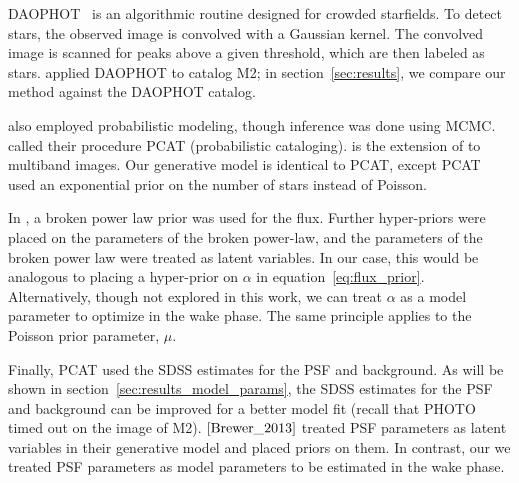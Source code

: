 DAOPHOT~\cite{stetson2987daophot} is an algorithmic routine designed for crowded starfields. To detect stars, the observed image is convolved with a Gaussian kernel. The convolved image is scanned for peaks above a given threshold, which are then labeled as stars. \cite{An_2008_m2} applied DAOPHOT to catalog M2; in section~\ref{sec:results}, we compare our method 
against the DAOPHOT catalog. 

\cite{Brewer_2013, Portillo_2017, Feder_2019} also employed probabilistic modeling, though inference was done using MCMC. \cite{Portillo_2017, Feder_2019} called their procedure PCAT (probabilistic cataloging). \cite{Feder_2019} is the extension 
of \cite{Portillo_2017} to multiband images. Our generative model is identical to PCAT, except PCAT used an exponential prior on the number of stars instead of Poisson. 

In \cite{Brewer_2013}, a broken power law prior was used for the flux. 
Further hyper-priors were placed on the parameters of the broken power-law, and the parameters of the broken power law were treated as latent variables. In our case, this would be analogous to placing a hyper-prior on $\alpha$ in equation~\eqref{eq:flux_prior}. Alternatively, though not explored in this work, we can treat $\alpha$ as a model parameter to optimize in the wake phase. The same principle applies to the Poisson prior parameter, $\mu$. 

Finally, PCAT used the SDSS estimates for the PSF and background.
As will be shown in section~\ref{sec:results_model_params}, the SDSS estimates for the PSF and background can be improved for a better model fit (recall that PHOTO timed out 
on the image of M2). $\cite{Brewer_2013}$ treated PSF parameters as latent variables in their generative model and placed priors on them. In contrast, our we treated PSF parameters as model parameters to be estimated in the wake phase. 

